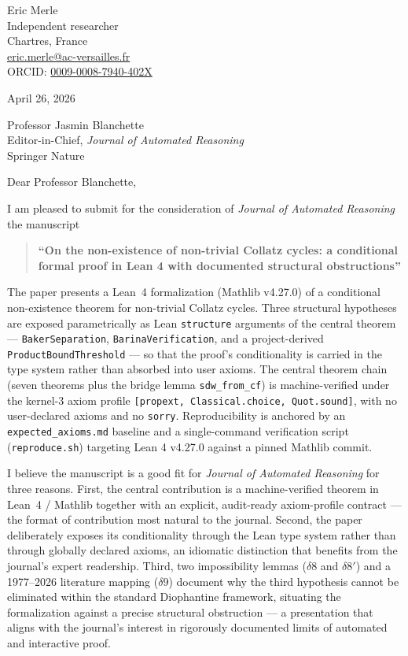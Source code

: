 \documentclass[11pt,a4paper]{article}
\begin{document}
\noindent
Eric Merle\\
Independent researcher\\
Chartres, France\\
\href{mailto:eric.merle@ac-versailles.fr}{eric.merle@ac-versailles.fr}\\
ORCID: \href{https://orcid.org/0009-0008-7940-402X}{0009-0008-7940-402X}

\bigskip
\noindent
April 26, 2026

\bigskip
\noindent
Professor Jasmin Blanchette\\
Editor-in-Chief, \emph{Journal of Automated Reasoning}\\
Springer Nature

\bigskip
\noindent
Dear Professor Blanchette,

\bigskip

I am pleased to submit for the consideration of \emph{Journal of Automated Reasoning} the manuscript

\begin{quote}
\textbf{``On the non-existence of non-trivial Collatz cycles: a conditional formal proof in Lean 4 with documented structural obstructions''}
\end{quote}

The paper presents a Lean~4 formalization (Mathlib v4.27.0) of a conditional non-existence theorem for non-trivial Collatz cycles. Three structural hypotheses are exposed parametrically as Lean \texttt{structure} arguments of the central theorem ---  \texttt{BakerSeparation}, \texttt{BarinaVerification}, and a project-derived \texttt{ProductBoundThreshold} --- so that the proof's conditionality is carried in the type system rather than absorbed into user axioms. The central theorem chain (seven theorems plus the bridge lemma \texttt{sdw\_from\_cf}) is machine-verified under the kernel-3 axiom profile \texttt{[propext, Classical.choice, Quot.sound]}, with no user-declared axioms and no \texttt{sorry}. Reproducibility is anchored by an \texttt{expected\_axioms.md} baseline and a single-command verification script (\texttt{reproduce.sh}) targeting Lean 4 v4.27.0 against a pinned Mathlib commit.

I believe the manuscript is a good fit for \emph{Journal of Automated Reasoning} for three reasons. First, the central contribution is a machine-verified theorem in Lean~4 / Mathlib together with an explicit, audit-ready axiom-profile contract --- the format of contribution most natural to the journal. Second, the paper deliberately exposes its conditionality through the Lean type system rather than through globally declared axioms, an idiomatic distinction that benefits from the journal's expert readership. Third, two impossibility lemmas ($\delta 8$ and $\delta 8'$) and a 1977--2026 literature mapping ($\delta 9$) document why the third hypothesis cannot be eliminated within the standard Diophantine framework, situating the formalization against a precise structural obstruction --- a presentation that aligns with the journal's interest in rigorously documented limits of automated and interactive proof.
\end{document}
